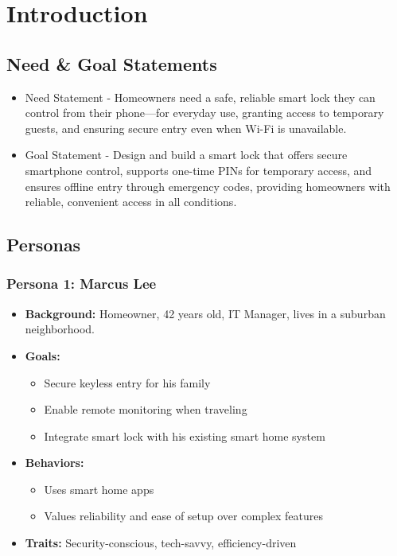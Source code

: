 \newpage

\section{Introduction}

\begin{comment}
 What is required for Introduction:
 - Need & Goal statement
 - Personas
 - Research into existing designs / products that meet / partially meet the need
 - Sustainability Statement
\end{comment}


\subsection{Need \& Goal Statements}
\begin{itemize}
    \item Need Statement - Homeowners need a safe, reliable smart lock they can control from their phone—for everyday use, granting access to temporary guests, and ensuring secure entry even when Wi-Fi is unavailable.
    
    \item Goal Statement - Design and build a smart lock that offers secure smartphone control, supports one-time PINs for temporary access, and ensures offline entry through emergency codes, providing homeowners with reliable, convenient access in all conditions.
\end{itemize}

\subsection{Personas}
\subsubsection*{Persona 1: Marcus Lee}

\begin{itemize}
    \item \textbf{Background:} Homeowner, 42 years old, IT Manager, lives in a suburban neighborhood.
    \item \textbf{Goals:} 
    \begin{itemize}
        \item Secure keyless entry for his family
        \item Enable remote monitoring when traveling
        \item Integrate smart lock with his existing smart home system
    \end{itemize}
    \item \textbf{Behaviors:}
    \begin{itemize}
        \item Uses smart home apps
        \item Values reliability and ease of setup over complex features
    \end{itemize}
    \item \textbf{Traits:} Security-conscious, tech-savvy, efficiency-driven
\end{itemize}


